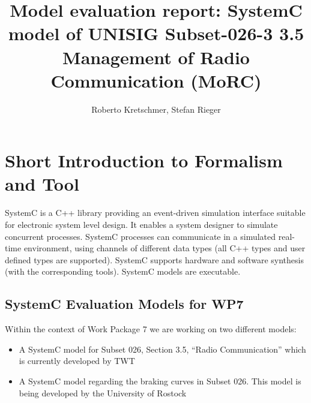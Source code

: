 \documentclass{template/openetcs_article}
\begin{document}
\frontmatter
{}





\author{Roberto Kretschmer, Stefan Rieger}


\title{Model evaluation report: SystemC model of UNISIG Subset-026-3 3.5 Management of Radio Communication (MoRC)}




\maketitle
\tableofcontents
\listoffiguresandtables
\newpage

\section{Short Introduction to Formalism and Tool}
\label{sec:short-intr-form}

SystemC is a C++ library providing an event-driven simulation interface suitable for electronic system level design. It enables a system designer to simulate concurrent processes. SystemC processes can communicate in a simulated real-time environment, using channels of different data types (all C++ types and user defined types are supported). SystemC supports hardware and software synthesis (with the corresponding tools). SystemC models are executable.

\subsection{SystemC Evaluation Models for WP7}

Within the context of Work Package 7 we are working on two different models:
\begin{itemize}
  \item A SystemC model for Subset 026, Section 3.5, ``Radio Communication'' which is currently developed by TWT
  \item A SystemC model regarding the braking curves in Subset 026. This model is being developed by the University of Rostock
\end{itemize}
\end{document}
